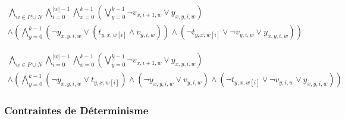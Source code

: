 \begin{tcolorbox}[defaultstyle,title=Contrainte 5]
\begin{itemize}
        \begin{multline*}
        \bigwedge_{w\in P \cup N}\bigwedge_{i=0}^{|w|-1}\bigwedge_{x=0}^{k-1} \left( \bigvee_{y=0}^{k-1} \lnot v_{x,i+1,w} \lor y_{x,y,i,w} \right) \\
        \land \left( \bigwedge_{y=0}^{k-1} ( \lnot y_{x,y,i,w} \lor (t_{y,x,w[i]} \land v_{y,i,w}) ) \land (\lnot t_{y,x,w[i]} \lor \lnot v_{y,i,w} \lor y_{x,y,i,w}) \right)
        \end{multline*}
        
        \begin{multline*}
        \bigwedge_{w\in P \cup N}\bigwedge_{i=0}^{|w|-1}\bigwedge_{x=0}^{k-1} \left( \bigvee_{y=0}^{k-1} \lnot v_{x,i+1,w} \lor y_{x,y,i,w} \right) \\
        \land \left( \bigwedge_{y=0}^{k-1} ( \lnot y_{x,y,i,w} \lor t_{y,x,w[i]} ) \land (\lnot y_{x,y,i,w} \lor v_{y,i,w}) \land (\lnot t_{y,x,w[i]} \lor \lnot v_{y,i,w} \lor y_{x,y,i,w}) \right)
        \end{multline*}
        
   \end{itemize}
   
\end{tcolorbox}

\subsubsection*{Contraintes de Déterminisme}
\label{determinisme}



